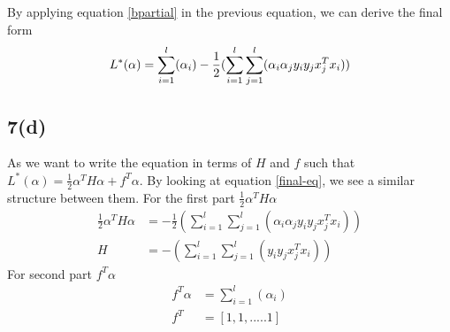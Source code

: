 \documentclass{article}
\begin{document}
By applying equation \ref{bpartial} in the previous equation, we can derive the final form
\begin{equation}\label{final-eq}
L^*(\alpha) = \sum_{i=1}^l(\alpha_i) - \frac{1}{2}(\sum_{i=1}^l\sum_{j=1}^l(\alpha_i \alpha_j y_i y_j x_j^T x_i))\\
\end{equation}

\subsection*{7(d)}
As we want to write the equation in terms of $H$ and $f$ such that $L^*(\alpha) = \frac{1}{2} \alpha^TH\alpha + f^T\alpha$. By looking at equation \ref{final-eq}, we see a similar structure between them. For the first part $\frac{1}{2} \alpha^TH\alpha $
\begin{equation*}
\begin{aligned}
\frac{1}{2}\alpha^TH\alpha &= -\frac{1}{2}(\sum_{i=1}^l\sum_{j=1}^l(\alpha_i \alpha_j y_i y_j x_j^T x_i))\\
H &= -(\sum_{i=1}^l\sum_{j=1}^l(y_i y_j x_j^T x_i))
\end{aligned}
\end{equation*}
For second part $f^T\alpha$
\begin{equation*}
\begin{aligned}
f^T\alpha &= \sum_{i=1}^l(\alpha_i)\\
f^T &= [1,1,.....1]
\end{aligned}
\end{equation*}
\end{document}
